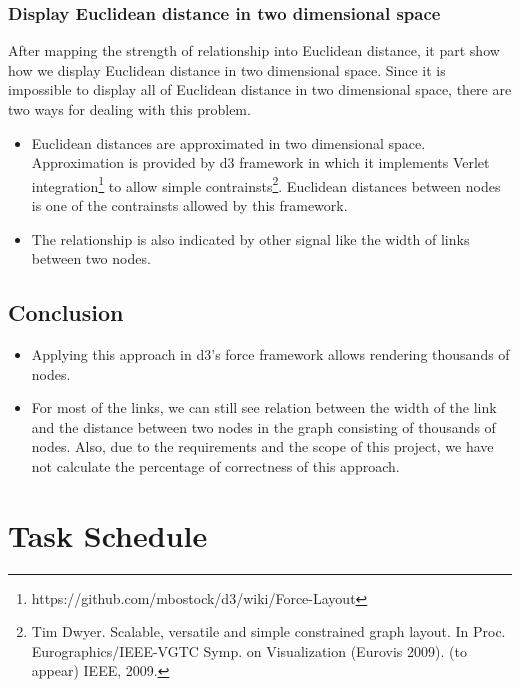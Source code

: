 \documentclass[12pt, letterpaper]{article}
\begin{document}
  \subsubsection{Display Euclidean distance in two dimensional space}
   After mapping the strength of relationship into Euclidean distance,
   it part show how we display Euclidean distance in two dimensional
   space. Since it is impossible to display all of Euclidean distance
   in two dimensional space, there are two ways for dealing with this
   problem.
     \begin{itemize}
       \item Euclidean distances are approximated in two dimensional
         space.  Approximation is provided by d3 framework in which it
         implements Verlet integration\footnote{https://github.com/mbostock/d3/wiki/Force-Layout} to allow
         simple contrainsts\footnote{Tim Dwyer. Scalable, versatile
           and simple constrained graph layout. In
           Proc. Eurographics/IEEE-VGTC Symp. on Visualization
           (Eurovis 2009). (to appear) IEEE, 2009.}.  Euclidean
         distances between nodes is one of the contrainsts allowed by
         this framework.
       \item The relationship is also indicated by other signal like
         the width of links between two nodes.
     \end{itemize}

 \subsection{Conclusion}
   \begin{itemize}
       \item Applying this approach in d3's force framework allows
         rendering thousands of nodes. 
       \item For most of the links, we can still see relation between the width of the link
         and the distance between two nodes in the graph consisting
         of thousands of nodes. Also, due to the requirements and the
         scope of this project, we have not calculate the percentage
         of correctness of this approach.
     \end{itemize}

\section{Task Schedule}
\end{document}
